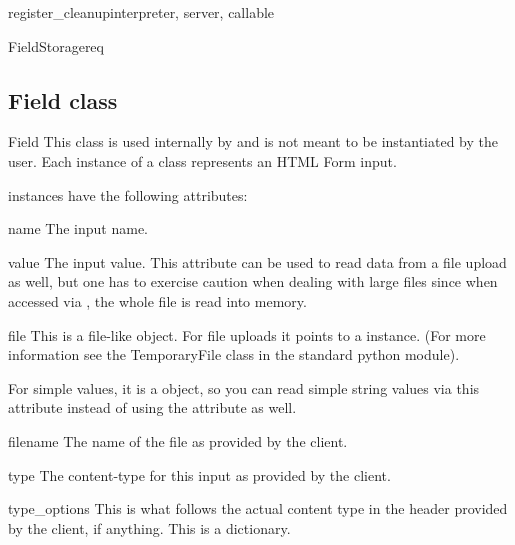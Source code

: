 \begin{funcdesc}{register_cleanup}{interpreter, server, callable}
\begin{classdesc}{FieldStorage}{req}
\end{classdesc}

\subsection{Field class\label{pyapi-util-fstor-fld}}

\begin{classdesc}{Field}{}
  This class is used internally by  and is not
  meant to be instantiated by the user. Each instance of a 
  class represents an HTML Form input.

   instances have the following attributes:

  \begin{memberdesc}{name}
    The input name.
  \end{memberdesc}

  \begin{memberdesc}{value}
    The input value. This attribute can be used to read data from a file
    upload as well, but one has to exercise caution when dealing with
    large files since when accessed via , the whole file is
    read into memory.
  \end{memberdesc}

  \begin{memberdesc}{file}
    This is a file-like object. For file uploads it points to a 
     instance. (For more information see the TemporaryFile
    class in the standard python
     module).

    For simple values, it is a  object, so you can read
    simple string values via this attribute instead of using the 
    attribute as well.
  \end{memberdesc}

  \begin{memberdesc}{filename}
    The name of the file as provided by the client.
  \end{memberdesc}

  \begin{memberdesc}{type}
    The content-type for this input as provided by the client.
  \end{memberdesc}

  \begin{memberdesc}{type_options}
    This is what follows the actual content type in the 
    header provided by the client, if anything. This is a dictionary.
  \end{memberdesc}


\end{classdesc}
\end{funcdesc}
